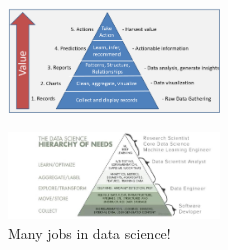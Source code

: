 \documentclass{article}
\begin{document}
\begin{figure}[H]
    \centering
    \includegraphics[width=0.5\textwidth]{data-science-pyramid.png}
\end{figure}


\begin{figure}[H]
    \centering
    \includegraphics[width=0.5\textwidth]{data-science-hierarchy-of-needs.jpg}
    \caption{Many jobs in data science!}
\end{figure}
\end{document}
